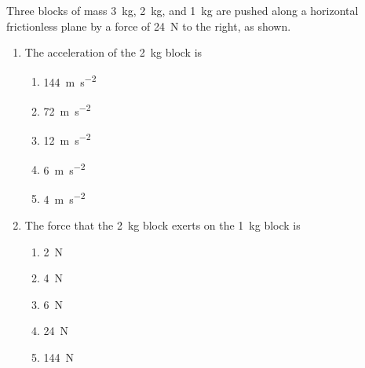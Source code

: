 \documentclass{../../oss-apphys}
\begin{document}
\begin{multicols}{2}
  Three blocks of mass \SI{3}{\kilo\gram}, \SI{2}{\kilo\gram}, and
  \SI{1}{\kilo\gram} are pushed along a horizontal frictionless plane by a
  force of \SI{24}{\newton} to the right, as shown.
  \begin{center}
  \end{center}
  \begin{enumerate}[resume,leftmargin=18pt]
  \item The acceleration of the \SI{2}{\kilo\gram} block is
    \begin{enumerate}[noitemsep,topsep=0pt,leftmargin=18pt,label=(\Alph*)]
    \item\SI{144}{\metre\per\second^2}
    \item\SI{72 }{\metre\per\second^2}
    \item\SI{12 }{\metre\per\second^2}
    \item\SI{6  }{\metre\per\second^2}
    \item\SI{4  }{\metre\per\second^2}
    \end{enumerate}
    \label{3blks1}
    
  \item The force that the \SI{2}{\kilo\gram} block exerts on the
    \SI{1}{\kilo\gram} block is
    \begin{enumerate}[noitemsep,topsep=0pt,leftmargin=18pt,label=(\Alph*)]
    \item \SI{2}{\newton}
    \item \SI{4}{\newton}
    \item \SI{6}{\newton}
    \item \SI{24}{\newton}
    \item \SI{144}{\newton}
    \end{enumerate}
    \label{3blks2}
    
    \columnbreak
    

\end{enumerate}
\end{multicols}
\end{document}
